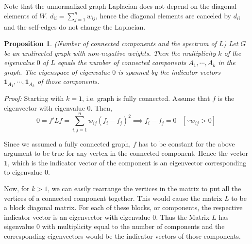 \documentclass[10pt,a4paper, nocenter]{report}
\newtheorem{prop}{Proposition}
\begin{document}
    Note that the unnormalized graph Laplacian does not depend on the diagonal elements of $W$. $d_{ii} = \sum_{j=1}^{n}w_{ij}$, hence the diagonal elements are canceled by $d_{ii}$ and the self-edges do not change the Laplacian. \\
    
    \begin{prop}
        (Number of connected components and the spectrum of $L$) Let $G$ be an undirected graph with non-negative weights. Then the multiplicity $k$ of the eigenvalue $0$ of $L$ equals the number of connected components $A_{1},\cdots,A_{k}$ in the graph. The eigenspace of eigenvalue $0$ is spanned by the indicator vectors $\mathbf{1}_{A_{1}},\cdots,\mathbf{1}_{A_{k}}$ of those components.				
    \end{prop}
    \textit{Proof:}
    Starting with $k=1$, i.e. graph is fully connected. Assume that $f$ is the eigenvector with eigenvalue $0$. Then,
    $$ 0 = f'Lf = \sum_{i,j=1}^{n}w_{ij}(f_{i}-f_{j})^{2} \implies f_{i} - f_{j}=0 \hspace{10pt}[\because w_{ij} > 0]$$
    
    Since we assumed a fully connected graph, $f$ has to be constant for the above argument to be true for any vertex in the connected component. Hence the vector $\textbf{1}$, which is the indicator vector of the component is an eigenvector corresponding to eigenvalue $0$. 
    
    Now, for $k>1$, we can easily rearrange the vertices in the matrix to put all the vertices of a connected component together. This would cause the matrix $L$ to be a block diagonal matrix. For each of these blocks, or components, the respective indicator vector is an eigenvector with eigenvalue 0. Thus the Matrix $L$ has eigenvalue $0$ with multiplicity equal to the number of components and the corresponding eigenvectors would be the indicator vectors of those components. 
    $ $\\
\end{document}
